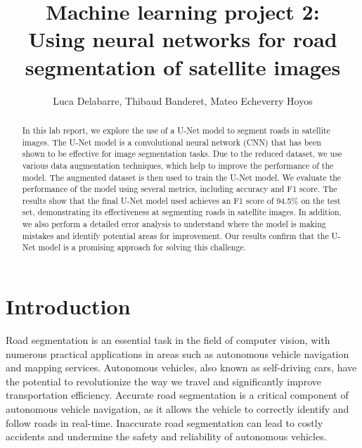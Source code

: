 \documentclass[10pt,conference,compsocconf]{IEEEtran}
\begin{document}
\title{\Large{Machine learning project 2:\\
Using neural networks for road segmentation of satellite images}}

\author{Luca Delabarre, Thibaud Banderet, Mateo Echeverry Hoyos}

\maketitle

\begin{abstract}
In this lab report, we explore the use of a U-Net model to segment roads in satellite images. The U-Net model is a convolutional neural network (CNN) that has been shown to be effective for image segmentation tasks. Due to the reduced dataset, we use various data augmentation techniques, which help to improve the performance of the model. The augmented dataset is then used to train the U-Net model. We evaluate the performance of the model using several metrics, including accuracy and F1 score. The results show that the final U-Net model used achieves an F1 score of 94.5\% on the test set, demonstrating its effectiveness at segmenting roads in satellite images. In addition, we also perform a detailed error analysis to understand where the model is making mistakes and identify potential areas for improvement. Our results confirm that the U-Net model is a promising approach for solving this challenge.
\end{abstract}

\section{Introduction}
Road segmentation is an essential task in the field of computer vision, with numerous practical applications in areas such as autonomous vehicle navigation and mapping services. Autonomous vehicles, also known as self-driving cars, have the potential to revolutionize the way we travel and significantly improve transportation efficiency. Accurate road segmentation is a critical component of autonomous vehicle navigation, as it allows the vehicle to correctly identify and follow roads in real-time. Inaccurate road segmentation can lead to costly accidents and undermine the safety and reliability of autonomous vehicles.
\end{document}
